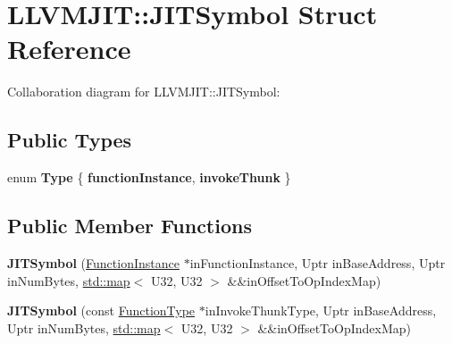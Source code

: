 \hypertarget{struct_l_l_v_m_j_i_t_1_1_j_i_t_symbol}{}\section{L\+L\+V\+M\+J\+IT\+:\+:J\+I\+T\+Symbol Struct Reference}
\label{struct_l_l_v_m_j_i_t_1_1_j_i_t_symbol}


Collaboration diagram for L\+L\+V\+M\+J\+IT\+:\+:J\+I\+T\+Symbol\+:
\subsection*{Public Types}
\begin{DoxyCompactItemize}
\item 
\mbox{\label{struct_l_l_v_m_j_i_t_1_1_j_i_t_symbol_a9a0d70b85813539820657e2b751abc34}} 
enum {\bfseries Type} \{ {\bfseries function\+Instance}, 
{\bfseries invoke\+Thunk}
 \}
\end{DoxyCompactItemize}
\subsection*{Public Member Functions}
\begin{DoxyCompactItemize}
\item 
\mbox{\label{struct_l_l_v_m_j_i_t_1_1_j_i_t_symbol_a65ddcf0eec0a2513bad2dfc7769cdb55}} 
{\bfseries J\+I\+T\+Symbol} (\mbox{\hyperlink{struct_runtime_1_1_function_instance}{Function\+Instance}} $\ast$in\+Function\+Instance, Uptr in\+Base\+Address, Uptr in\+Num\+Bytes, \mbox{\hyperlink{classstd_1_1map}{std\+::map}}$<$ U32, U32 $>$ \&\&in\+Offset\+To\+Op\+Index\+Map)
\item 
\mbox{\label{struct_l_l_v_m_j_i_t_1_1_j_i_t_symbol_adb9921d321b7db381b4693c735608bf5}} 
{\bfseries J\+I\+T\+Symbol} (const \mbox{\hyperlink{struct_i_r_1_1_function_type}{Function\+Type}} $\ast$in\+Invoke\+Thunk\+Type, Uptr in\+Base\+Address, Uptr in\+Num\+Bytes, \mbox{\hyperlink{classstd_1_1map}{std\+::map}}$<$ U32, U32 $>$ \&\&in\+Offset\+To\+Op\+Index\+Map)
\end{DoxyCompactItemize}
